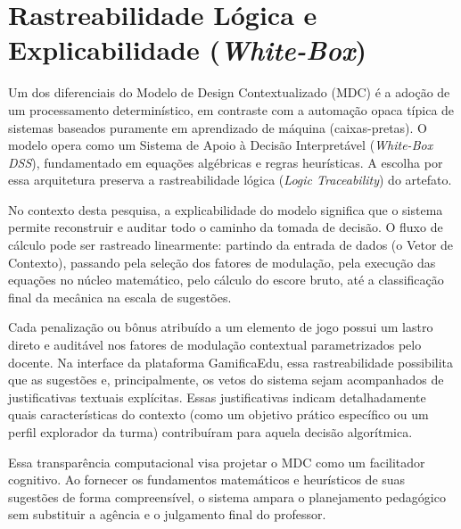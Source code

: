 

\section{Rastreabilidade Lógica e Explicabilidade (\textit{White-Box})}

Um dos diferenciais do Modelo de Design Contextualizado (MDC) é a adoção de um processamento determinístico, em contraste com a automação opaca típica de sistemas baseados puramente em aprendizado de máquina (caixas-pretas). O modelo opera como um Sistema de Apoio à Decisão Interpretável (\textit{White-Box DSS}), fundamentado em equações algébricas e regras heurísticas. A escolha por essa arquitetura preserva a rastreabilidade lógica (\textit{Logic Traceability}) do artefato.

No contexto desta pesquisa, a explicabilidade do modelo significa que o sistema permite reconstruir e auditar todo o caminho da tomada de decisão. O fluxo de cálculo pode ser rastreado linearmente: partindo da entrada de dados (o Vetor de Contexto), passando pela seleção dos fatores de modulação, pela execução das equações no núcleo matemático, pelo cálculo do escore bruto, até a classificação final da mecânica na escala de sugestões.

Cada penalização ou bônus atribuído a um elemento de jogo possui um lastro direto e auditável nos fatores de modulação contextual parametrizados pelo docente. Na interface da plataforma GamificaEdu, essa rastreabilidade possibilita que as sugestões e, principalmente, os vetos do sistema sejam acompanhados de justificativas textuais explícitas. Essas justificativas indicam detalhadamente quais características do contexto (como um objetivo prático específico ou um perfil explorador da turma) contribuíram para aquela decisão algorítmica.

Essa transparência computacional visa projetar o MDC como um facilitador cognitivo. Ao fornecer os fundamentos matemáticos e heurísticos de suas sugestões de forma compreensível, o sistema ampara o planejamento pedagógico sem substituir a agência e o julgamento final do professor.



